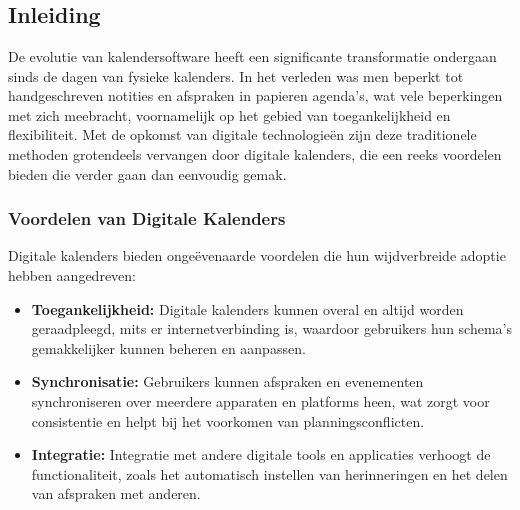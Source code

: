 \chapter{}%
\label{ch:stand-van-zaken}


\section{Inleiding}

De evolutie van kalendersoftware heeft een significante transformatie ondergaan sinds de dagen van fysieke kalenders. In het verleden was men beperkt tot handgeschreven notities en afspraken in papieren agenda's, wat vele beperkingen met zich meebracht, voornamelijk op het gebied van toegankelijkheid en flexibiliteit. Met de opkomst van digitale technologieën zijn deze traditionele methoden grotendeels vervangen door digitale kalenders, die een reeks voordelen bieden die verder gaan dan eenvoudig gemak.

\subsection{Voordelen van Digitale Kalenders}
Digitale kalenders bieden ongeëvenaarde voordelen die hun wijdverbreide adoptie hebben aangedreven:
\begin{itemize}
    \item \textbf{Toegankelijkheid:} Digitale kalenders kunnen overal en altijd worden geraadpleegd, mits er internetverbinding is, waardoor gebruikers hun schema's gemakkelijker kunnen beheren en aanpassen.
    \item \textbf{Synchronisatie:} Gebruikers kunnen afspraken en evenementen synchroniseren over meerdere apparaten en platforms heen, wat zorgt voor consistentie en helpt bij het voorkomen van planningsconflicten.
    \item \textbf{Integratie:} Integratie met andere digitale tools en applicaties verhoogt de functionaliteit, zoals het automatisch instellen van herinneringen en het delen van afspraken met anderen.
\end{itemize}

